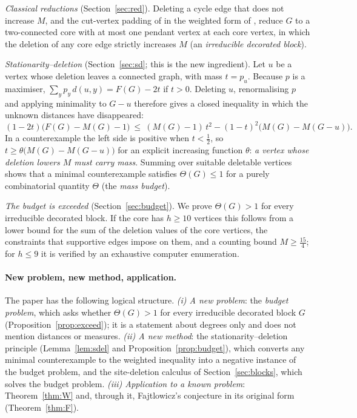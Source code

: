 \documentclass[11pt,a4paper]{article}
\theoremstyle{definition}
\theoremstyle{remark}
\numberwithin{equation}{section}
\begin{document}
\emph{Classical reductions} (Section~\ref{sec:red}). Deleting a cycle edge that does
not increase $M$, and the cut-vertex padding of \cite[Lemma~4]{DLS} in the weighted
form of \cite{VMRC189}, reduce $G$ to a two-connected core with at most one pendant
vertex at each core vertex, in which the deletion of any core edge strictly
increases $M$ (an \emph{irreducible decorated block}).

\emph{Stationarity--deletion} (Section~\ref{sec:sd}; this is the new ingredient). Let
$u$ be a vertex whose deletion leaves a connected graph, with mass $t=p_u$.
Because $p$ is a maximiser, $\sum_yp_y\,d(u,y)=F(G)-2t$ if $t>0$. Deleting $u$,
renormalising $p$ and applying minimality to $G-u$ therefore gives a closed
inequality in which the unknown distances have disappeared:
\[
 (1-2t)\bigl(F(G)-M(G)-1\bigr)\ \le\ (M(G)-1)\,t^2-(1-t)^2\bigl(M(G)-M(G-u)\bigr).
\]
In a counterexample the left side is positive when $t<\frac12$, so
$t\ge\theta\bigl(M(G)-M(G-u)\bigr)$ for an explicit increasing function $\theta$:
\emph{a vertex whose deletion lowers $M$ must carry mass}. Summing over suitable
deletable vertices shows that a minimal counterexample satisfies $\Theta(G)\le1$
for a purely combinatorial quantity $\Theta$ (the \emph{mass budget}).

\emph{The budget is exceeded} (Section~\ref{sec:budget}). We prove $\Theta(G)>1$ for
every irreducible decorated block. If the core has $h\ge10$ vertices this follows
from a lower bound for the sum of the deletion values of the core vertices, the
constraints that supportive edges impose on them, and a counting bound
$M\ge\frac{15}4$; for $h\le9$ it is verified by an exhaustive computer enumeration.

\paragraph{New problem, new method, application.}
The paper has the following logical structure. \emph{(i) A new problem}: the
\emph{budget problem}, which asks whether $\Theta(G)>1$ for every irreducible
decorated block $G$ (Proposition~\ref{prop:exceed}); it is a statement about degrees
only and does not mention distances or measures. \emph{(ii) A new method}: the
stationarity--deletion principle (Lemma~\ref{lem:sdel} and
Proposition~\ref{prop:budget}), which converts any minimal counterexample to the
weighted inequality into a negative instance of the budget problem, and the
site-deletion calculus of Section~\ref{sec:blocks}, which solves the budget
problem. \emph{(iii) Application to a known problem}: Theorem~\ref{thm:W} and,
through it, Fajtlowicz's conjecture in its original form (Theorem~\ref{thm:F}).
\end{document}
